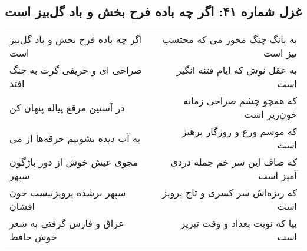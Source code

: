 \begin{center}
\section*{غزل شماره ۴۱: اگر چه باده فرح بخش و باد گل‌بیز است}
\label{sec:sh041}
\begin{longtable}{l p{0.5cm} r}
اگر چه باده فرح بخش و باد گل‌بیز است
&&
به بانگ چنگ مخور می که محتسب تیز است
\\
صراحی ای و حریفی گرت به چنگ افتد
&&
به عقل نوش که ایام فتنه انگیز است
\\
در آستین مرقع پیاله پنهان کن
&&
که همچو چشم صراحی زمانه خون‌ریز است
\\
به آب دیده بشوییم خرقه‌ها از می
&&
که موسم ورع و روزگار پرهیز است
\\
مجوی عیش خوش از دور باژگون سپهر
&&
که صاف این سر خم جمله دردی آمیز است
\\
سپهر برشده پرویزنیست خون افشان
&&
که ریزه‌اش سر کسری و تاج پرویز است
\\
عراق و فارس گرفتی به شعر خوش حافظ
&&
بیا که نوبت بغداد و وقت تبریز است
\\
\end{longtable}
\end{center}
